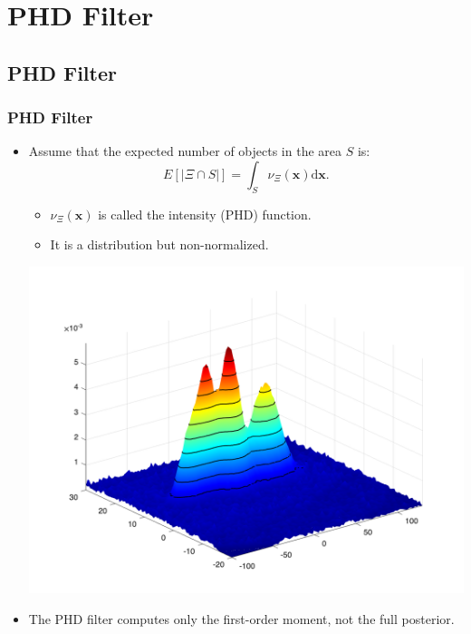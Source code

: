 \section{PHD Filter}

\subsection*{PHD Filter}\begin{frame}[t]\frametitle{PHD Filter}
    \begin{itemize}
        \item Assume that the expected number of objects in the area $S$ is:
            \begin{equation*}
                E[| \Xi \cap S |] = \int_S \nu_\Xi(\mathbf{x}) \mathrm{d} \mathbf{x}.
            \end{equation*}
            \begin{itemize}
                \item $\nu_\Xi(\mathbf{x})$ is called the intensity (PHD) function.
                \item It is a distribution but non-normalized.
            \end{itemize}
        \begin{center}
            \includegraphics[width=0.5\linewidth]{pic/phd-fun.png}
        \end{center}
        \pause
        \item The PHD filter computes only the first-order moment, not the full posterior.
    \end{itemize}
\end{frame}

